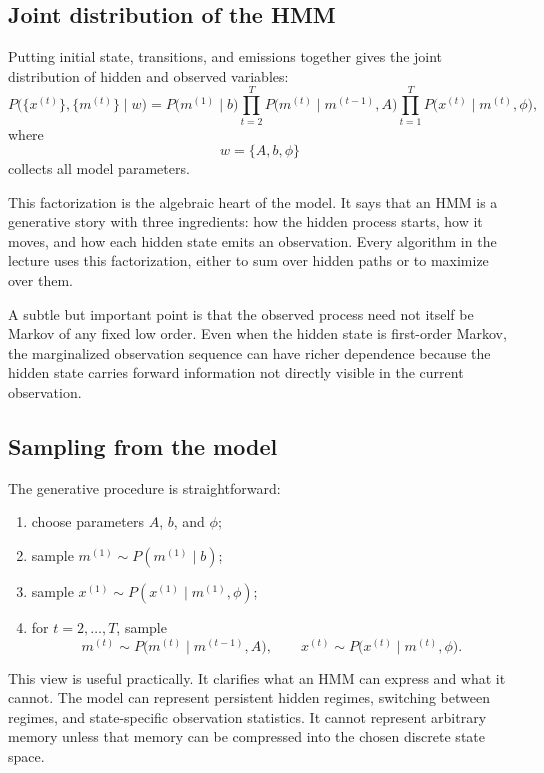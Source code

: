 \subsection{Joint distribution of the HMM}

Putting initial state, transitions, and emissions together gives the joint distribution of hidden and observed variables:
\[
  P\bigl(\{x^{(t)}\},\{m^{(t)}\}\mid w\bigr)
  =
  P\bigl(m^{(1)}\mid b\bigr)
  \prod_{t=2}^{T} P\bigl(m^{(t)}\mid m^{(t-1)},A\bigr)
  \prod_{t=1}^{T} P\bigl(x^{(t)}\mid m^{(t)},\phi\bigr),
\]
where
\[
  w=\{A,b,\phi\}
\]
collects all model parameters.

This factorization is the algebraic heart of the model. It says that an HMM is a generative story with three ingredients: how the hidden process starts, how it moves, and how each hidden state emits an observation. Every algorithm in the lecture uses this factorization, either to sum over hidden paths or to maximize over them.

A subtle but important point is that the observed process need not itself be Markov of any fixed low order. Even when the hidden state is first-order Markov, the marginalized observation sequence can have richer dependence because the hidden state carries forward information not directly visible in the current observation.

\subsection{Sampling from the model}

The generative procedure is straightforward:
\begin{enumerate}
  \item choose parameters $A$, $b$, and $\phi$;
  \item sample $m^{(1)}\sim P(m^{(1)}\mid b)$;
  \item sample $x^{(1)}\sim P(x^{(1)}\mid m^{(1)},\phi)$;
  \item for $t=2,\dots,T$, sample
  \[
    m^{(t)}\sim P\bigl(m^{(t)}\mid m^{(t-1)},A\bigr),
    \qquad
    x^{(t)}\sim P\bigl(x^{(t)}\mid m^{(t)},\phi\bigr).
  \]
\end{enumerate}

This view is useful practically. It clarifies what an HMM can express and what it cannot. The model can represent persistent hidden regimes, switching between regimes, and state-specific observation statistics. It cannot represent arbitrary memory unless that memory can be compressed into the chosen discrete state space.

